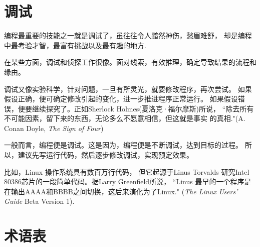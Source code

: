 \documentclass[10pt]{book}
\begin{document}
\section{调试}

编程最重要的技能之一就是调试了，虽往往令人黯然神伤，愁眉难舒，
却是编程中最考验才智，最富有挑战以及最有趣的地方.

在某些方面，调试和侦探工作很像。面对线索，有效推理，确定导致结果的流程和缘由。

调试又像实验科学，针对问题，一旦有所灵光，就要修改程序，再次尝试。
如果假设正确，便可确定修改引起的变化，进一步推进程序正常运行。
如果假设错误，便要继续探究了。正如Sherlock Holmes(夏洛克·福尔摩斯)所说，
``除去所有不可能因素，留下来的东西，无论多么不愿意相信，但这就是事实
的真相."(A. Conan Doyle, {\em The Sign of Four})

一般而言，编程便是调试。这是因为，编程便是不断调试，达到目标的过程。
所以，建议先写运行代码，然后逐步修改调试，实现预定效果。

比如，Linux 操作系统具有数百万行代码， 但它起源于Linus Torvalds
研究Intel 80386芯片的一段简单代码。据Larry Greenfield所说，
``Linus 最早的一个程序是在输出AAAA和BBBB之间切换，这后来演化为了Linux."
({\em The Linux Users' Guide} Beta Version 1).


\section{术语表}
\end{document}
